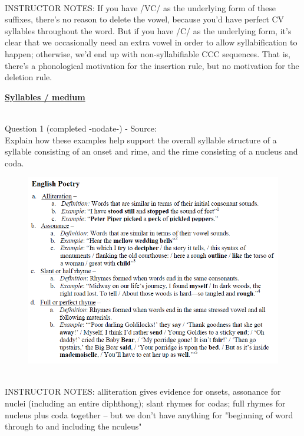 \documentclass[12pt]{article}
\begin{document}
~\\
INSTRUCTOR NOTES: If you have /VC/ as the underlying form of these suffixes, there’s no reason to delete the vowel, because you'd have perfect CV syllables throughout the word. But if you have /C/ as the underlying form, it’s clear that we occasionally need an extra vowel in order to allow syllabification to happen; otherwise, we’d end up with non-syllabifiable CCC sequences. That is, there’s a phonological motivation for the insertion rule, but no motivation for the deletion rule.


\newpage\textbf{\underline{\huge Syllables / medium\\}}

~\\

{\large Question 1} (completed -nodate-) - Source: \\

Explain how these examples help support the overall syllable structure of a syllable consisting of an onset and rime, and the rime consisting of a nucleus and coda.\\

\begin{figure}[H]
\includegraphics{../images/english_poetry.png}
\end{figure}

~\\
INSTRUCTOR NOTES: alliteration gives evidence for onsets, assonance for nuclei (including an entire diphthong); slant rhymes for codas; full rhymes for nucleus plus coda together -- but we don't have anything for "beginning of word through to and including the nculeus"
\end{document}
